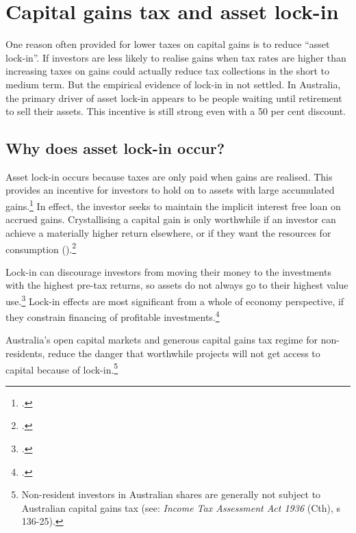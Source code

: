 \documentclass[continuous]{grattan}
\begin{document}
\chapter{Capital gains tax and asset lock-in}\label{appendix:CGT-asset-lock-in}
One reason often provided for lower taxes on capital gains is to reduce ``asset lock-in''. If investors are less likely to realise gains when tax rates are higher than increasing taxes on gains could actually reduce tax collections in the short to medium term. But the empirical evidence of lock-in in not settled. In Australia, the primary driver of asset lock-in appears to be people waiting until retirement to sell their assets. This incentive is still strong even with a 50 per cent discount. 

\section{Why does asset lock-in occur?}
Asset lock-in occurs because taxes are only paid when gains are realised. This provides an incentive for investors to hold on to assets with large accumulated gains.\footcite{Burman2009}  In effect, the investor seeks to maintain the implicit interest free loan on accrued gains. Crystallising a capital gain is only worthwhile if an investor can achieve a materially higher return elsewhere, or if they want the resources for consumption ().\footcite[][12]{Ingles2009a}   

Lock-in can discourage investors from moving their money to the investments with the highest pre-tax returns, so assets do not always go to their highest value use.\footcite{Lindsey1987}  Lock-in effects are most significant from a whole of economy perspective, if they constrain financing of profitable investments.\footcites{OECD2006TaxationOfCapitalGains}{Johnson2008}  

\newcommand{\Act}[2]{\textit{#1} (#2)}
Australia’s open capital markets and generous capital gains tax regime for non-residents, reduce the danger that worthwhile projects will not get access to capital because of lock-in.\footnote{Non-resident investors in Australian shares are generally not subject to Australian capital gains tax (see: \Act{Income Tax Assessment Act 1936}{Cth}, s 136-25). } 
\end{document}
